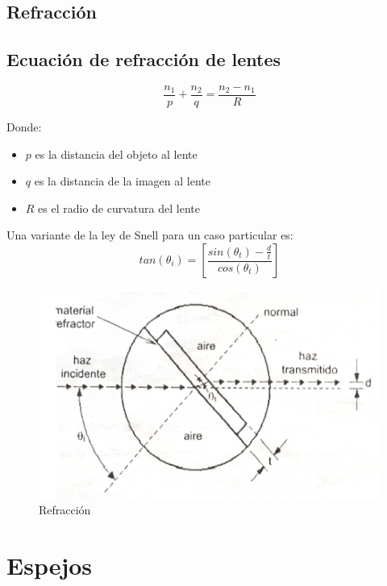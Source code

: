 \documentclass[]{article}
\begin{document}
\subsection{Refracción}

\subsection{Ecuación de refracción de lentes}

\begin{equation}
\frac{n_1}{p}+\frac{n_2}{q}=\frac{n_2-n_1}{R}
\end{equation}

Donde:\\

\begin{itemize}
	\item $p$ es la distancia del objeto al lente
	\item $q$ es la distancia de la imagen al lente
	\item $R$ es el radio de curvatura del lente
\end{itemize}

Una variante de la ley de Snell para un caso particular es:\\
\begin{equation}
tan(\theta_i)=[\frac{sin(\theta_t)-\frac{d}{t}}{cos(\theta_t)}]
\end{equation}

\begin{figure}[H]
	\centering
	\includegraphics[scale=0.5]{Imagenes/refrac}
	\caption{Refracción}
	\label{fig:refrac}
\end{figure}

\section{Espejos}
\end{document}
